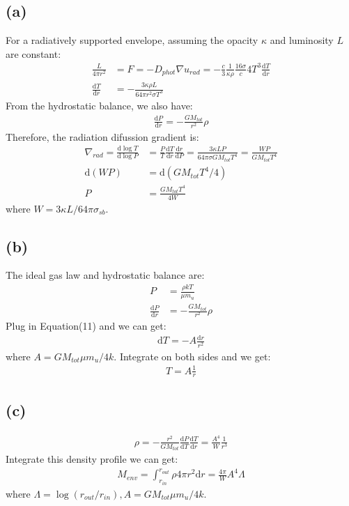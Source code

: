 \documentclass[a4paper,12pt]{article}
\renewcommand{\d}{\mathrm{d}}
\begin{document}
\subsection*{(a)}
For a radiatively supported envelope, assuming the opacity $\kappa$ and luminosity $L$ are constant:
\begin{align*}
    \frac{L}{4 \pi r^2} &= F = -D_{phot} \nabla u_{rad} = - \frac{c}{3} \frac{1}{\kappa \rho} \frac{16\sigma}{c} 4T^3 \frac{\d T}{\d r} \\
    \frac{\d T}{\d r} &= -\frac{3 \kappa \rho L}{64 \pi r^2 \sigma T^3} 
\end{align*}
From the hydrostatic balance, we also have:
\begin{align*}
    \frac{\d P}{\d r} = -\frac{GM_{tot}}{r^2} \rho
\end{align*}
Therefore, the radiation difussion gradient is:
\begin{align*}
    \nabla_{rad} = \frac{\d \log T}{\d \log P} &= \frac{P}{T} \frac{\d T}{\d r} \frac{\d r}{\d P} = \frac{3 \kappa L P}{64 \pi \sigma G M_{tot} T^4} = \frac{WP}{G M_{tot} T^4} \\
    \d(WP) &= \d(GM_{tot} T^4/4) \\
    P &= \frac{GM_{tot}T^4}{4W} 
\end{align*}
where $W = 3\kappa L / 64 \pi \sigma_{sb}$.

\subsection*{(b)}
The ideal gas law and hydrostatic balance are:
\begin{align*}
    P &= \frac{\rho kT}{\mu m_u} \\
    \frac{\d P}{\d r} &= -\frac{GM_{tot}}{r^2} \rho
\end{align*}
Plug in Equation(11) and we can get:
\begin{align*}
    \d T = -A \frac{\d r}{r^2}
\end{align*}
where $A = GM_{tot}\mu m_u / 4k$.
Integrate on both sides and we get:
\begin{align*}
    T  = A \frac{1}{r}
\end{align*}

\subsection*{(c)}
\begin{align*}
    \rho = -\frac{r^2}{G M_{tot}} \frac{\d P}{\d T} \frac{\d T}{\d r} = \frac{A^4}{W}\frac{1}{r^3}
\end{align*}
Integrate this density profile we can get:
\begin{align*}
    M_{env} = \int_{r_{in}}^{r_{out}} \rho 4\pi r^2 \d r = \frac{4\pi}{W} A^4 \Lambda
\end{align*}
where $\Lambda  = \log (r_{out}/r_{in}), A = GM_{tot}\mu m_u / 4k$.
\end{document}
